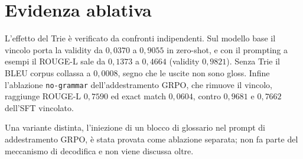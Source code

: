 \section{Evidenza ablativa}

L'effetto del Trie è verificato da confronti indipendenti. Sul modello base il
vincolo porta la validity da $0{,}0370$ a $0{,}9055$ in zero-shot, e con il
prompting a esempi il ROUGE-L sale da $0{,}1373$ a $0{,}4664$ (validity
$0{,}9821$). Senza Trie il BLEU corpus collassa a $0{,}0008$, segno che le uscite
non sono gloss. Infine l'ablazione \texttt{no-grammar} dell'addestramento GRPO,
che rimuove il vincolo, raggiunge ROUGE-L $0{,}7590$ ed exact match $0{,}0604$,
contro $0{,}9681$ e $0{,}7662$ dell'SFT vincolato.

Una variante distinta, l'iniezione di un blocco di glossario nel prompt di
addestramento GRPO, è stata provata come ablazione separata; non fa parte del
meccanismo di decodifica e non viene discussa oltre.
